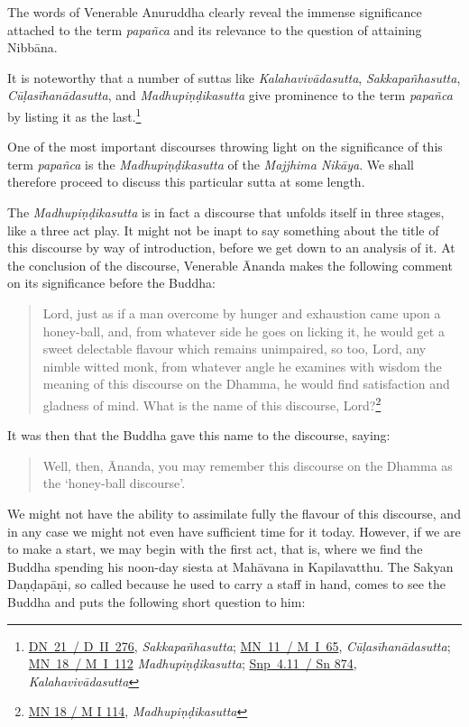 The words of Venerable Anuruddha clearly reveal the immense significance attached to the term \emph{papañca} and its relevance to the question of attaining Nibbāna.

It is noteworthy that a number of suttas like \emph{Kalahavivādasutta}, \emph{Sakkapañhasutta}, \emph{Cūḷasīhanādasutta}, and \emph{Madhupiṇḍikasutta} give prominence to the term \emph{papañca} by listing it as the last.\footnote{\href{https://suttacentral.net/dn21/pli/ms}{DN~21~/ D~II~276}, \emph{Sakkapañhasutta}; \href{https://suttacentral.net/mn11/pli/ms}{MN~11~/ M~I~65}, \emph{Cūḷasīhanādasutta}; \href{https://suttacentral.net/mn18/pli/ms}{MN~18~/ M~I~112} \emph{Madhupiṇḍikasutta}; \href{https://suttacentral.net/snp4.11/pli/ms}{Snp~4.11~/ Sn 874}, \emph{Kalahavivādasutta}}

One of the most important discourses throwing light on the significance of this term \emph{papañca} is the \emph{Madhupiṇḍikasutta} of the \emph{Majjhima Nikāya}. We shall therefore proceed to discuss this particular sutta at some length.

The \emph{Madhupiṇḍikasutta} is in fact a discourse that unfolds itself in three stages, like a three act play. It might not be inapt to say something about the title of this discourse by way of introduction, before we get down to an analysis of it. At the conclusion of the discourse, Venerable Ānanda makes the following comment on its significance before the Buddha:

\begin{quote}
Lord, just as if a man overcome by hunger and exhaustion came upon a honey-ball, and, from whatever side he goes on licking it, he would get a sweet delectable flavour which remains unimpaired, so too, Lord, any nimble witted monk, from whatever angle he examines with wisdom the meaning of this discourse on the Dhamma, he would find satisfaction and gladness of mind. What is the name of this discourse, Lord?\footnote{\href{https://suttacentral.net/mn18/pli/ms}{MN 18 / M I 114}, \emph{Madhupiṇḍikasutta}}
\end{quote}

It was then that the Buddha gave this name to the discourse, saying:

\begin{quote}
Well, then, Ānanda, you may remember this discourse on the Dhamma as the `honey-ball discourse'.
\end{quote}

We might not have the ability to assimilate fully the flavour of this discourse, and in any case we might not even have sufficient time for it today. However, if we are to make a start, we may begin with the first act, that is, where we find the Buddha spending his noon-day siesta at Mahāvana in Kapilavatthu. The Sakyan Daṇḍapāṇi, so called because he used to carry a staff in hand, comes to see the Buddha and puts the following short question to him:

